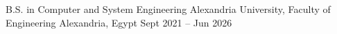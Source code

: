 

\begin{cventries}

  \cvshortentry
    {B.S. in Computer and System Engineering} %
    {Alexandria University, Faculty of Engineering} %
    {Alexandria, Egypt} %
    {Sept 2021 -- Jun 2026} %
    
\end{cventries}
